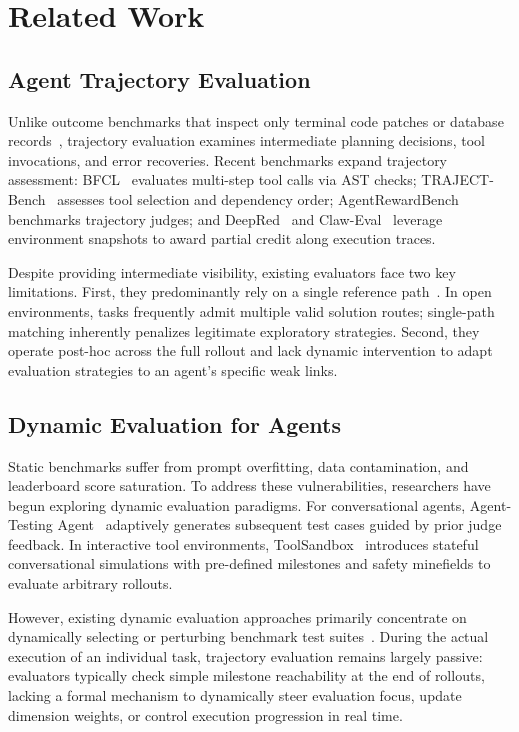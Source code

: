 \section{Related Work}
\label{sec:related_work}

\subsection{Agent Trajectory Evaluation}
Unlike outcome benchmarks that inspect only terminal code patches or database records~\citep{jimenez2024swebench,qin2023toolllm,liu2023agentbench,zhou2024webarena}, trajectory evaluation examines intermediate planning decisions, tool invocations, and error recoveries. Recent benchmarks expand trajectory assessment: BFCL~\citep{patil2025bfcl} evaluates multi-step tool calls via AST checks; TRAJECT-Bench~\citep{trajectbench2025} assesses tool selection and dependency order; AgentRewardBench~\citep{agentrewardbench2025} benchmarks trajectory judges; and DeepRed~\citep{deepred2026} and Claw-Eval~\citep{claweval2026} leverage environment snapshots to award partial credit along execution traces.

Despite providing intermediate visibility, existing evaluators face two key limitations. First, they predominantly rely on a single reference path~\citep{qian2024agentprocessbench}. In open environments, tasks frequently admit multiple valid solution routes; single-path matching inherently penalizes legitimate exploratory strategies. Second, they operate post-hoc across the full rollout and lack dynamic intervention to adapt evaluation strategies to an agent's specific weak links.

\subsection{Dynamic Evaluation for Agents}
Static benchmarks suffer from prompt overfitting, data contamination, and leaderboard score saturation. To address these vulnerabilities, researchers have begun exploring dynamic evaluation paradigms. For conversational agents, Agent-Testing Agent~\citep{agenttestingagent2026} adaptively generates subsequent test cases guided by prior judge feedback. In interactive tool environments, ToolSandbox~\citep{gu2024toolsandbox} introduces stateful conversational simulations with pre-defined milestones and safety minefields to evaluate arbitrary rollouts. 

However, existing dynamic evaluation approaches primarily concentrate on dynamically selecting or perturbing benchmark test suites~\citep{gu2024toolsandbox,agenttestingagent2026}. During the actual execution of an individual task, trajectory evaluation remains largely passive: evaluators typically check simple milestone reachability at the end of rollouts, lacking a formal mechanism to dynamically steer evaluation focus, update dimension weights, or control execution progression in real time.

